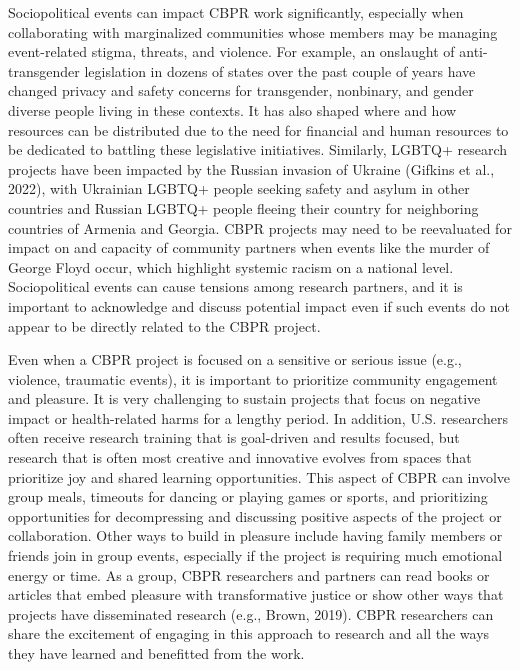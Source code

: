 \documentclass[
  11pt,
]{book}
\begin{document}
Sociopolitical events can impact CBPR work significantly, especially when collaborating with marginalized communities whose members may be managing event-related stigma, threats, and violence. For example, an onslaught of anti-transgender legislation in dozens of states over the past couple of years have changed privacy and safety concerns for transgender, nonbinary, and gender diverse people living in these contexts. It has also shaped where and how resources can be distributed due to the need for financial and human resources to be dedicated to battling these legislative initiatives. Similarly, LGBTQ+ research projects have been impacted by the Russian invasion of Ukraine (Gifkins et al., 2022), with Ukrainian LGBTQ+ people seeking safety and asylum in other countries and Russian LGBTQ+ people fleeing their country for neighboring countries of Armenia and Georgia. CBPR projects may need to be reevaluated for impact on and capacity of community partners when events like the murder of George Floyd occur, which highlight systemic racism on a national level. Sociopolitical events can cause tensions among research partners, and it is important to acknowledge and discuss potential impact even if such events do not appear to be directly related to the CBPR project.

Even when a CBPR project is focused on a sensitive or serious issue (e.g., violence, traumatic events), it is important to prioritize community engagement and pleasure. It is very challenging to sustain projects that focus on negative impact or health-related harms for a lengthy period. In addition, U.S. researchers often receive research training that is goal-driven and results focused, but research that is often most creative and innovative evolves from spaces that prioritize joy and shared learning opportunities. This aspect of CBPR can involve group meals, timeouts for dancing or playing games or sports, and prioritizing opportunities for decompressing and discussing positive aspects of the project or collaboration. Other ways to build in pleasure include having family members or friends join in group events, especially if the project is requiring much emotional energy or time. As a group, CBPR researchers and partners can read books or articles that embed pleasure with transformative justice or show other ways that projects have disseminated research (e.g., Brown, 2019). CBPR researchers can share the excitement of engaging in this approach to research and all the ways they have learned and benefitted from the work.
\end{document}

